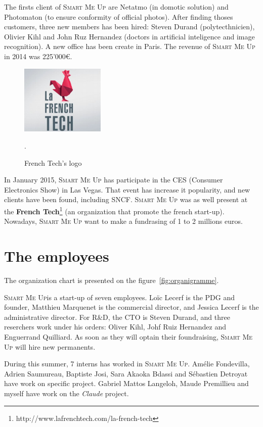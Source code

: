 \documentclass[a4paper,11pt]{custom}
\newcommand{\smu}{\textsc{Smart Me Up}}
\newcommand{\claude}{\textit{Claude}\xspace}
\begin{document}
The firsts client of \smu{} are Netatmo (in domotic solution) and Photomaton (to
ensure conformity of official photos). After finding thoses customers, three new
members has been hired: Steven Durand (polytecthnicien), Olivier Kihl and John
Ruz Hernandez (doctors in artificial inteligence and image recognition). A new
office has been create in Paris. The revenue of \smu{} in 2014 was 225'000\euro.

\begin{figure}
  \centering
  \includegraphics[width=4cm]{french-tech.jpg}
  \label{fig:frenchtech}
  \caption{French Tech's logo}.
\end{figure}

In January 2015, \smu{} has participate in the CES (Consumer Electronics Show) in
Las Vegas. That event has increase it popularity, and new clients have been
found, including SNCF. \smu{} was as well present at the \textbf{French
Tech}\footnote{http://www.lafrenchtech.com/la-french-tech}
(an organization that promote the french start-up). Nowadays, \smu{} want to
make a fundrasing of 1 to 2 millions euros.

\section{The employees}

The organization chart is presented on the figure~\ref{fig:organigramme}.

\smu is a start-up of seven employees. Loïc Lecerf is the PDG and founder,
Matthieu Marquenet is the commercial director, and Jessica Lecerf is the
administrative director. For R\&D, the CTO is Steven Durand, and three
reserchers work under his orders: Oliver Kihl, Johf Ruiz Hernandez and
Enguerrand Quilliard. As soon as they will optain their foundraising, \smu{}
will hire new permanents.

During this summer, 7 interns has worked in \smu. Amélie Fondevilla, Adrien
Saumureau, Baptiste Josi, Sara Akaoka Bdassi and Sébastien Detroyat have work on
specific project. Gabriel Mattos Langeloh, Maude Premillieu and myself have work
on the \claude{} project.
\end{document}
